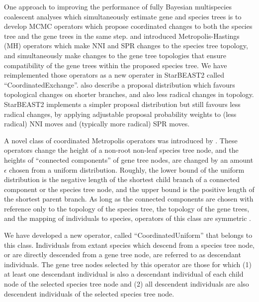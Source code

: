 \documentclass[12pt]{article}
\begin{document}
One approach to improving the performance of fully Bayesian multispecies
coalescent analyses which simultaneously estimate gene and species trees is to
develop MCMC operators which propose coordinated changes to both the species
tree and the gene trees in the same step. \cite{Yang01122014} and
\cite{2015arXiv151203843R} introduced Metropolis-Hastings (MH) operators which make
NNI and SPR changes to the species tree topology, and simultaneously make
changes to the gene tree topologies that ensure compatibility of the gene trees
within the proposed species tree. We have reimplemented those operators as a new
operater in StarBEAST2 called ``CoordinatedExchange''.
\cite{2015arXiv151203843R} also describe a proposal distribution which favours
topological changes on shorter branches, and also less radical changes in
topology. StarBEAST2 implements a simpler proposal distribution but still
favours less radical changes, by applying adjustable proposal probability
weights to (less radical) NNI moves and (typically more radical) SPR moves.

A novel class of coordinated Metropolis operators was introduced by
\cite{Jones010199}. These operators change the height of a non-root non-leaf
species tree node, and the heights of ``connected components'' of gene tree
nodes, are changed by an amount $\epsilon$ chosen from a uniform distribution. Roughly, the lower
bound of the uniform distribution is the negative length of the shortest child
branch of a connected component or the species tree node, and the upper bound is
the positive length of the shortest parent branch. As long as the connected
components are chosen with reference only to the topology of the species tree,
the topology of the gene trees, and the mapping of individuals to species,
operators of this class are symmetric \citep{Jones010199}.

We have developed a new operator, called ``CoordinatedUniform'' that belongs to
this class. Individuals from extant species which descend from a species tree
node, or are directly descended from a gene tree node, are referred to as
descendant individuals. The gene tree nodes selected by this operator are those
for which (1) at least one descendant individual is also a descendant individual
of each child node of the selected species tree node and (2) all descendent
individuals are also descendent individuals of the selected species tree node.
\end{document}
